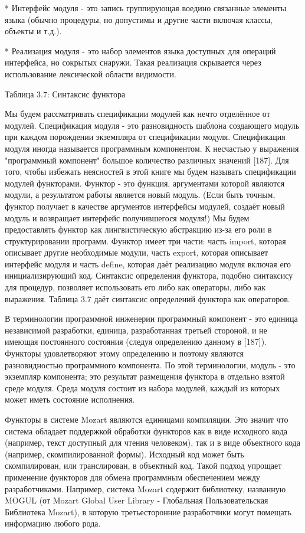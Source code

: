 * Интерфейс модуля - это запись группирующая воедино связанные элементы языка (обычно процедуры, но допустимы и другие части включая классы, объекты и т.д.).

* Реализация модуля - это набор элементов языка доступных для операций интерфейса, но сокрытых снаружи. Такая реализация скрывается через использование лексической области видимости.

Таблица 3.7: Синтаксис функтора

Мы будем рассматривать спецификации модулей как нечто отделённое от модулей. Спецификация модуля - это разновидность шаблона создающего модуль при каждом порождении экземпляра от спецификации модуля. Спецификация модуля иногда называется программным компонентом. К несчастью у выражения "программный компонент" большое количество различных значений [187]. Для того, чтобы избежать неясностей в этой книге мы будем называть спецификации модулей функторами. Функтор - это функция, аргументами которой являются модули, а результатом работы является новый модуль. (Если быть точным, функтор получает в качестве аргументов интерфейсы модулей, создаёт новый модуль и возвращает интерфейс получившегося модуля!) Мы будем предоставлять функтор как лингвистическую абстракцию из-за его роли в структурировании программ. Функтор имеет три части: часть import, которая описывает другие необходимые модули, часть export, которая описывает интерфейс модуля и часть define, которая даёт реализацию модуля включая его инициализирующий код. Синтаксис определения функтора, подобно синтаксису для процедур, позволяет использовать его либо как операторы, либо как выражения. Таблица 3.7 даёт синтаксис определений функтора как операторов.

В терминологии программной инженерии программный компонент - это единица независимой разработки, единица, разработанная третьей стороной, и не имеющая постоянного состояния (следуя определению данному в [187]). Функторы удовлетворяют этому определению и поэтому являются разновидностью программного компонента. По этой терминологии, модуль - это экземпляр компонента; это результат размещения функтора в отдельно взятой среде модуля. Среда модуля состоит из набора модулей, каждый из которых может иметь состояние исполнения.

Функторы в системе Mozart являются единицами компиляции. Это значит что система обладает поддержкой обработки функторов как в виде исходного кода (например, текст доступный для чтения человеком), так и в виде объектного кода (например, скомпилированной формы). Исходный код может быть скомпилирован, или транслирован, в объектный код. Такой подход упрощает применение функторов для обмена программным обеспечением между разработчиками. Например, система Mozart содержит библиотеку, названную MOGUL (от Mozart Global User Library - Глобальная Пользовательская Библиотека Mozart), в которую третьесторонние разработчики могут помещать информацию любого рода.

